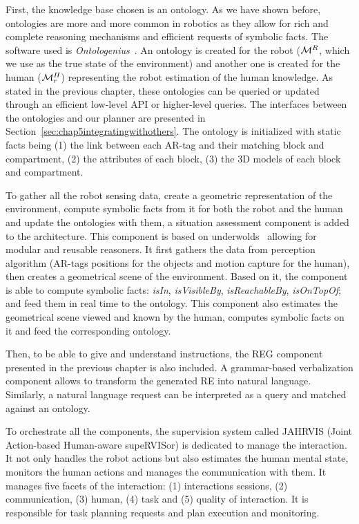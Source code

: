 \documentclass[a4paper,11pt,twoside]{StyleThese}
\begin{document}
First, the knowledge base chosen is an ontology. As we have shown before, ontologies are more and more common in robotics as they allow for rich and complete reasoning mechanisms and efficient requests of symbolic facts. The software used is \textit{Ontologenius}~\cite{sarthou2019ontologenius}. An ontology is created for the robot ($\mathcal{M}^R$, which we use as the true state of the environment) and another one is created for the human ($\mathcal{M}^H_r$) representing the robot estimation of the human knowledge. As stated in the previous chapter, these ontologies can be queried or updated through an efficient low-level API or higher-level \sparql{} queries. The interfaces between the ontologies and our planner are presented in Section~\ref{sec:chap5integratingwithothers}. The ontology is initialized with static facts being (1) the link between each AR-tag and their matching block and compartment, (2) the attributes of each block, (3) the 3D models of each block and compartment.

To gather all the robot sensing data, create a geometric representation of the environment, compute symbolic facts from it for both the robot and the human and update the ontologies with them, a situation assessment component is added to the architecture. This component is based on underwolds~\cite{lemaignan2018underworlds} allowing for modular and reusable reasoners. It first gathers the data from perception algorithm (AR-tags positions for the objects and motion capture for the human), then creates a geometrical scene of the environment. Based on it, the component is able to compute symbolic facts: \textit{isIn}, \textit{isVisibleBy}, \textit{isReachableBy}, \textit{isOnTopOf}; and feed them in real time to the ontology. This component also estimates the geometrical scene viewed and known by the human, computes symbolic facts on it and feed the corresponding ontology.

Then, to be able to give and understand instructions, the REG component presented in the previous chapter is also included. A grammar-based verbalization component allows to transform the generated RE into natural language. Similarly, a natural language request can be interpreted as a \sparql{} query and matched against an ontology.

To orchestrate all the components, the supervision system called JAHRVIS (Joint Action-based Human-aware supeRVISor) is dedicated to manage the interaction. It not only handles the robot actions but also estimates the human mental state, monitors the human actions and manages the communication with them. It manages five facets of the interaction: (1) interactions sessions, (2) communication, (3) human, (4) task and (5) quality of interaction. It is responsible for task planning requests and plan execution and monitoring.
\end{document}
